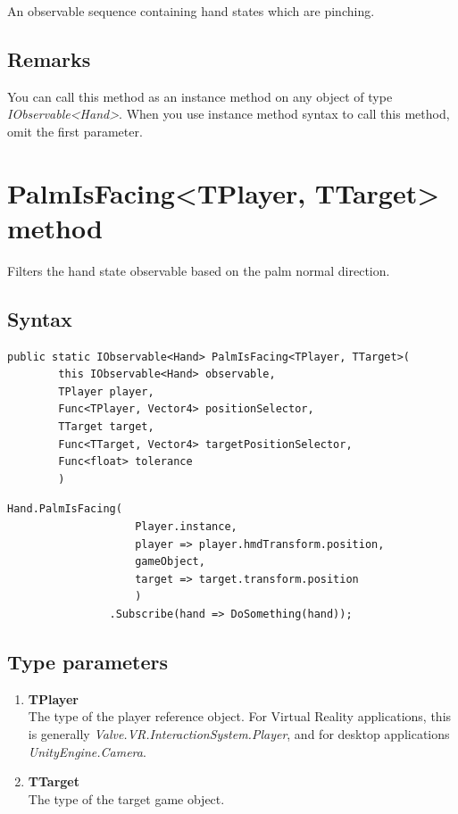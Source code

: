 \documentclass[12pt,a4paper,twoside]{report}
\begin{document}
An observable sequence containing hand states which are pinching.

\subsection{Remarks}
You can call this method as an instance method on any object of type \textit{IObservable<Hand>}. When you use 
instance method syntax to call this method, omit the first parameter.

\newpage

\section{PalmIsFacing<TPlayer, TTarget> method}
Filters the hand state observable based on the palm normal direction.

\subsection{Syntax}
\begin{lstlisting}[caption=Declaration]
    public static IObservable<Hand> PalmIsFacing<TPlayer, TTarget>(
        this IObservable<Hand> observable,
        TPlayer player,
        Func<TPlayer, Vector4> positionSelector,
        TTarget target,
        Func<TTarget, Vector4> targetPositionSelector,
        Func<float> tolerance
        )
\end{lstlisting}
\begin{lstlisting}[caption=Usage example]
    Hand.PalmIsFacing(
                    Player.instance,
                    player => player.hmdTransform.position,
                    gameObject,
                    target => target.transform.position
                    )
                .Subscribe(hand => DoSomething(hand));
\end{lstlisting}

\subsection{Type parameters}
\begin{enumerate}
    \item \textbf{TPlayer}\\
        The type of the player reference object. For Virtual Reality applications, this is generally \textit{Valve.VR.InteractionSystem.Player}, and for desktop applications \textit{UnityEngine.Camera}.
        
    \item \textbf{TTarget}\\
        The type of the target game object.
\end{enumerate}
\end{document}
